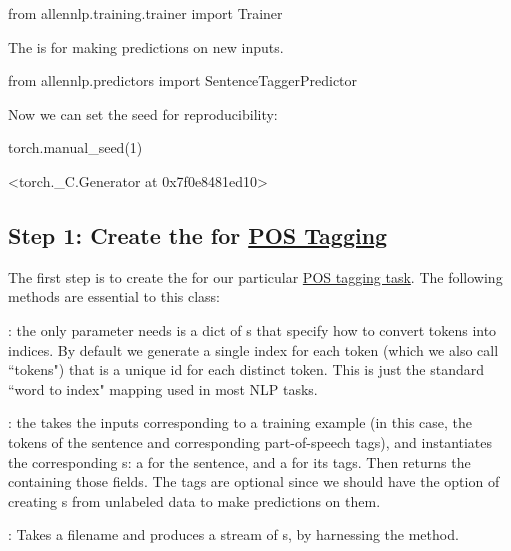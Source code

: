 \begin{pythonCode}
from allennlp.training.trainer import Trainer
\end{pythonCode}

The  is for making predictions on new inputs.

\begin{pythonCode}
from allennlp.predictors import SentenceTaggerPredictor
\end{pythonCode}

Now we can set the seed for reproducibility:

\begin{pythonCode}
torch.manual_seed(1)
\end{pythonCode}


\begin{outputCode}
<torch._C.Generator at 0x7f0e8481ed10>
\end{outputCode}




\subsection*{Step 1: Create the  for \hyperref[nlptask:postagging]{POS Tagging}}



The first step is to create the  for our particular \hyperref[nlptask:postagging]{POS tagging task}. The following methods are essential to this class: 

\begin{itemizeSpaced}{3pt}
    \item {}: the only parameter  needs is a dict of s that specify how to convert tokens into indices. By default we generate a single index for each token (which we also call ``tokens") that is a unique id for each distinct token. This is just the standard ``word to index" mapping used in most NLP tasks.
    
    \item {}: the  takes the inputs corresponding to a training example (in this case, the tokens of the sentence and corresponding part-of-speech tags), and instantiates the corresponding s: a  for the sentence, and a  for its tags. Then  returns the  containing those fields. The tags are optional since we should have the option of creating s from unlabeled data to make predictions on them.
    
    \item {}: Takes a filename and produces a stream of s, by harnessing the  method.
    
\end{itemizeSpaced}





